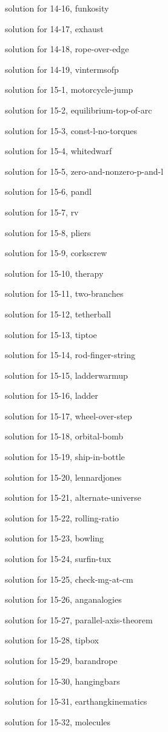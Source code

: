 \documentclass{problems}
\begin{document}
solution for 14-16, funkosity

solution for 14-17, exhaust

solution for 14-18, rope-over-edge

solution for 14-19, vintermsofp

solution for 15-1, motorcycle-jump

solution for 15-2, equilibrium-top-of-arc

solution for 15-3, const-l-no-torques

solution for 15-4, whitedwarf

solution for 15-5, zero-and-nonzero-p-and-l

solution for 15-6, pandl

solution for 15-7, rv

solution for 15-8, pliers

solution for 15-9, corkscrew

solution for 15-10, therapy

solution for 15-11, two-branches

solution for 15-12, tetherball

solution for 15-13, tiptoe

solution for 15-14, rod-finger-string

solution for 15-15, ladderwarmup

solution for 15-16, ladder

solution for 15-17, wheel-over-step

solution for 15-18, orbital-bomb

solution for 15-19, ship-in-bottle

solution for 15-20, lennardjones

solution for 15-21, alternate-universe

solution for 15-22, rolling-ratio

solution for 15-23, bowling

solution for 15-24, surfin-tux

solution for 15-25, check-mg-at-cm

solution for 15-26, anganalogies

solution for 15-27, parallel-axis-theorem

solution for 15-28, tipbox

solution for 15-29, barandrope

solution for 15-30, hangingbars

solution for 15-31, earthangkinematics

solution for 15-32, molecules
\end{document}
